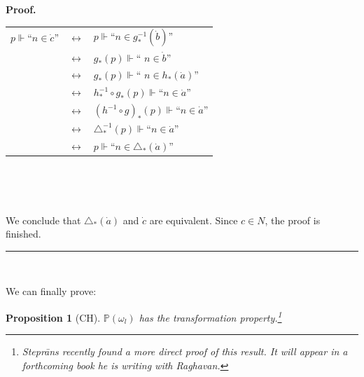 \documentclass{article}%
\newtheorem{proposition}[theorem]{Proposition}
\newenvironment{proof}[1][Proof]{\noindent\textbf{#1.} }{\ \rule{0.5em}{0.5em}}
\begin{document}
\begin{proof}
\qquad\qquad\ \ \ \ \ 

\hfill%
\begin{tabular}
[c]{lll}%
$p\Vdash$\textquotedblleft$n\in\dot{c}$\textquotedblright &
$\longleftrightarrow$ & $p\Vdash$\textquotedblleft$n\in g_{\ast}^{-1}(\dot
{b})$\textquotedblright\\
& $\longleftrightarrow$ & $g_{\ast}\left(  p\right)  \Vdash$\textquotedblleft%
$n\in\dot{b}$\textquotedblright\\
& $\longleftrightarrow$ & $g_{\ast}\left(  p\right)  \Vdash$\textquotedblleft%
$n\in h_{\ast}\left(  \dot{a}\right)  $\textquotedblright\\
& $\longleftrightarrow$ & $h_{\ast}^{-1}\circ g_{\ast}\left(  p\right)
\Vdash$\textquotedblleft$n\in\dot{a}$\textquotedblright\\
& $\longleftrightarrow$ & $\left(  h^{-1}\circ g\right)  _{\ast}\left(
p\right)  \Vdash$\textquotedblleft$n\in\dot{a}$\textquotedblright\\
& $\longleftrightarrow$ & $\triangle_{\ast}^{-1}\left(  p\right)  \Vdash
$\textquotedblleft$n\in\dot{a}$\textquotedblright\\
& $\longleftrightarrow$ & $p\Vdash$\textquotedblleft$n\in\triangle_{\ast
}\left(  \dot{a}\right)  $\textquotedblright%
\end{tabular}
\qquad\ \qquad\hfill

\qquad\qquad\qquad\qquad\ \ \ 

We conclude that $\triangle_{\ast}\left(  \dot{a}\right)  $ and $\dot{c}$ are
equivalent. Since $c\in N$, the proof is finished.
\end{proof}

\qquad\ \ \ \qquad\ \ \ \ 

We can finally prove:

\begin{proposition}
[\textsf{CH}]$\mathbb{P}\left(  \omega_{l}\right)  $ has the transformation
property.\footnote{Stepr\={a}ns recently found a more direct proof of this
result. It will appear in a forthcoming book he is writing with Raghavan.}
\end{proposition}
\end{document}
